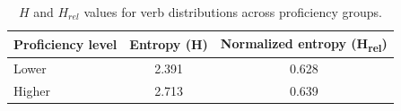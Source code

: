 \begin{table}[htbp]
\centering
\begin{tabular}{lcc}
\hline
\textbf{Proficiency level} & \textbf{Entropy (H)} & \textbf{Normalized entropy (H\textsubscript{rel})} \\
\hline
Lower  & 2.391 & 0.628 \\
Higher & 2.713 & 0.639 \\
\hline
\end{tabular}
\caption{$H$ and $H_{rel}$ values for verb distributions across proficiency groups.}
\label{tab:entropy}
\end{table}